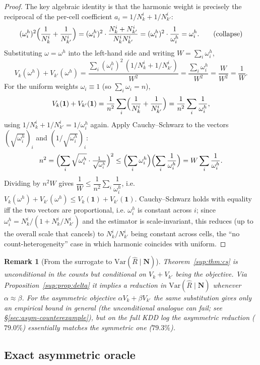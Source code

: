 \documentclass[11pt]{article}
\newtheorem{remark}{Remark}
\begin{document}
\begin{proof}
The key algebraic identity is that the harmonic weight is precisely the
reciprocal of the per-cell coefficient $a_i=1/N_k^i+1/N_{k'}^i$:
\[
(\omega_i^h)^2\Bigl(\frac{1}{N_k^i}+\frac{1}{N_{k'}^i}\Bigr)
=(\omega_i^h)^2\cdot\frac{N_k^i+N_{k'}^i}{N_k^iN_{k'}^i}
=(\omega_i^h)^2\cdot\frac{1}{\omega_i^h}
=\omega_i^h .
\tag{collapse}
\]
Substituting $\omega=\omega^h$ into the left-hand side and writing
$W=\sum_i\omega_i^h$,
\[
V_k(\omega^h)+V_{k'}(\omega^h)
=\frac{\sum_i(\omega_i^h)^2\,(1/N_k^i+1/N_{k'}^i)}{W^2}
=\frac{\sum_i\omega_i^h}{W^2}
=\frac{W}{W^2}=\frac{1}{W}.
\]
For the uniform weights $\omega_i\equiv 1$ (so $\sum_i\omega_i=n$),
\[
V_k(\mathbf 1)+V_{k'}(\mathbf 1)
=\frac{1}{n^2}\sum_i\Bigl(\frac{1}{N_k^i}+\frac{1}{N_{k'}^i}\Bigr)
=\frac{1}{n^2}\sum_i\frac{1}{\omega_i^h},
\]
using $1/N_k^i+1/N_{k'}^i=1/\omega_i^h$ again. Apply Cauchy--Schwarz to
the vectors $(\sqrt{\omega_i^h})_i$ and $(1/\sqrt{\omega_i^h})_i$:
\[
n^2=\Bigl(\sum_i\sqrt{\omega_i^h}\cdot\tfrac{1}{\sqrt{\omega_i^h}}\Bigr)^2
\le\Bigl(\sum_i\omega_i^h\Bigr)\Bigl(\sum_i\frac{1}{\omega_i^h}\Bigr)
=W\sum_i\frac{1}{\omega_i^h}.
\]
Dividing by $n^2 W$ gives
$\dfrac{1}{W}\le\dfrac{1}{n^2}\sum_i\dfrac{1}{\omega_i^h}$, i.e.
$V_k(\omega^h)+V_{k'}(\omega^h)\le V_k(\mathbf 1)+V_{k'}(\mathbf 1)$.
Cauchy--Schwarz holds with equality iff the two vectors are
proportional, i.e. $\omega_i^h$ is constant across $i$; since
$\omega_i^h=N_k^i/(1+N_k^i/N_{k'}^i)$ and the estimator is
scale-invariant, this reduces (up to the overall scale that cancels) to
$N_k^i/N_{k'}^i$ being constant across cells, the ``no
count-heterogeneity'' case in which harmonic coincides with uniform.
\end{proof}

\begin{remark}[From the surrogate to $\mathrm{Var}(\hat R\mid\mathbf N)$]
Theorem~\ref{sup:thm:cs} is unconditional in the counts but conditional
on $V_k+V_{k'}$ being the objective. Via
Proposition~\ref{sup:prop:delta} it implies a reduction in
$\mathrm{Var}(\hat R\mid\mathbf N)$ whenever $\alpha\approx\beta$. For
the asymmetric objective $\alpha V_k+\beta V_{k'}$ the same substitution
gives only an empirical bound in general (the unconditional analogue can
fail; see \S\ref{sec:asym-counterexample}), but on the full KDD log the
asymmetric reduction ($79.0\%$) essentially matches the symmetric one
($79.3\%$).
\end{remark}

\subsection{Exact asymmetric oracle}
\end{document}
